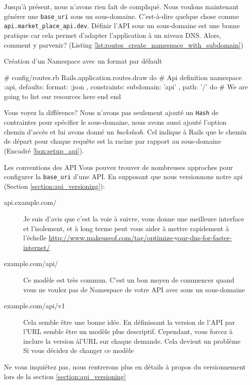 \documentclass[]{report}
\begin{document}
      Jusqu'à présent, nous n'avons rien fait de compliqué. Nous voulons maintenant générer une \verb|base_uri| sous un sous-domaine. C'est-à-dire quelque chose comme \verb|api.market_place_api.dev|. Définir l'API sous un sous-domaine est une bonne pratique car cela permet d'adapter l'application à un niveau DNS. Alors, comment y parvenir? (Listing \ref{lst:routes_create_namespace_with_subdomain})

      \begin{listing}
        \caption{Création d'un Namespace avec un format par défault}
        \label{lst:routes_create_namespace_with_subdomain}
        \begin{rubycode}
        # config/routes.rb
        Rails.application.routes.draw do
          # Api definition
          namespace :api, defaults: { format: :json }, constraints: { subdomain: 'api' }, path: '/'  do
            # We are going to list our resources here
          end
        end
        \end{rubycode}
      \end{listing}

      Vous voyez la différence? Nous n'avons pas seulement ajouté un \verb|Hash| de contraintes pour spécifier le sous-domaine, nous avons aussi ajouté l'option chemin d'accès et lui avons donné un \textit{backslash}. Cel indique à Rails que le chemin de départ pour chaque requête est la racine par rapport au sous-domaine (Encadré \ref{box:setup_api}).

      \begin{tcolorbox}{Les conventions des API}\label{box:setup_api}
        Vous pouvez trouver de nombreuses approches pour configurer la \verb|base_uri| d'une API. En supposant que nous versionnons notre api (Section \ref{section:api_versioning}):

        \begin{description}
          \item[api.example.com/] Je suis d'avis que c'est la voie à suivre, vous donne une meilleure interface et l'isolement, et à long terme peut vous aider à mettre rapidement à l'échelle \url{http://www.makeuseof.com/tag/optimize-your-dns-for-faster-internet/}
          \item[example.com/api/] Ce modèle est très commun. C'est un bon moyen de commencer quand vous ne voulez pas de Namespace de votre API avec sous un sous-domaine
          \item[example.com/api/v1] Cela semble être une bonne idée. En définissant la version de l'API par l'URL semble être un modèle plus descriptif. Cependant, vous forcez à inclure la version àl'URL sur chaque demande. Cela devient un problème Si vous décidez de changer ce modèle
        \end{description}

        Ne vous inquiétez pas, nous rentrerons plus en détails à propos du versionnement lors de la section \ref{section:api_versioning}

      \end{tcolorbox}
\end{document}
